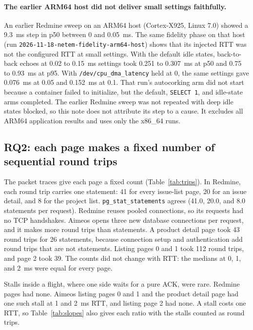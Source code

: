 \documentclass[11pt]{article}
\begin{document}
\paragraph{The earlier ARM64 host did not deliver small settings faithfully.} An earlier
Redmine sweep on an ARM64 host (Cortex-X925, Linux 7.0) showed a 9.3~ms step in p50 between 0
and 0.05~ms. The same fidelity phase on that host (run
\texttt{2026-11-18-netem-fidelity-arm64-host}) shows that its injected RTT was not the
configured RTT at small settings. With the default idle states, back-to-back echoes at 0.02 to
0.15~ms settings took 0.251 to 0.307~ms at p50 and 0.75 to 0.93~ms at p95. With
\texttt{/dev/cpu\_dma\_latency} held at 0, the same settings gave 0.076~ms at 0.05 and
0.152~ms at 0.1. That run's autocorking arm did not start because a container failed to
initialize, but the default, \texttt{SELECT 1}, and idle-state arms completed. The earlier
Redmine sweep was not repeated with deep idle states blocked, so this note does not attribute
its step to a cause. It excludes all ARM64 application results and uses only the x86\_64
runs.

\subsection{RQ2: each page makes a fixed number of sequential round trips}

The packet traces give each page a fixed count (Table~\ref{tab:trips}). In Redmine, each
round trip carries one statement: 41 for every issue-list page, 20 for an issue detail, and 8
for the project list. \texttt{pg\_stat\_statements} agrees (41.0, 20.0, and 8.0 statements per
request). Redmine reuses pooled connections, so its requests had no TCP handshakes. Aimeos
opens three new database connections per request, and it makes more round trips than
statements. A product detail page took 43 round trips for 26 statements, because connection
setup and authentication add round trips that are not statements. Listing pages 0 and 1 took
112 round trips, and page 2 took 39. The counts did not change with RTT: the medians at 0, 1,
and 2~ms were equal for every page.

Stalls inside a flight, where one side waits for a pure ACK, were rare. Redmine pages had none.
Aimeos listing pages 0 and 1 and the product detail page had one such stall at 1 and 2~ms RTT,
and listing page 2 had none. A stall costs one RTT, so Table~\ref{tab:slopes} also gives each
ratio with the stalls counted as round trips.
\end{document}
